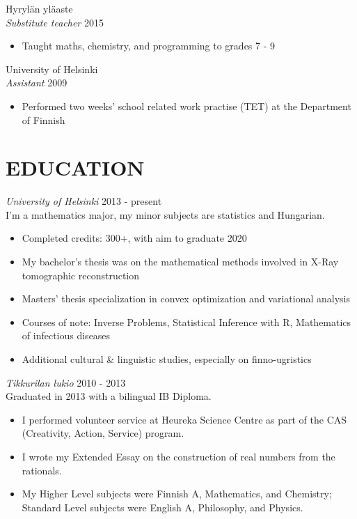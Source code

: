 \documentclass[margin, 10pt]{res} %
\begin{document}
\begin{resume}
\addvspace{-7pt}
Hyrylän yläaste\\
{\sl Substitute teacher} \hfill 2015
\begin{itemize} \itemsep -2pt %
\item Taught maths, chemistry, and programming to grades 7 - 9
\end{itemize}
\addvspace{-7pt}
University of Helsinki\\
{\sl Assistant} \hfill 2009
\begin{itemize} \itemsep -2pt %
\item Performed two weeks' school related work practise (TET) at the Department of Finnish
\end{itemize}
  

\section{EDUCATION}

{\sl University of Helsinki} \hfill 2013 - present\\
I'm a mathematics major, my minor subjects are statistics and Hungarian.
\begin{itemize} \itemsep -2pt
\item Completed credits: 300+, with aim to graduate 2020
\item My bachelor's thesis was on the mathematical methods involved in X-Ray tomographic reconstruction
\item Masters' thesis specialization in convex optimization and variational analysis
\item Courses of note: Inverse Problems, Statistical Inference with R, Mathematics of infectious diseases
\item Additional cultural \& linguistic studies, especially on finno-ugristics
\end{itemize}

\addvspace{-7pt}
{\sl Tikkurilan lukio} \hfill 2010 - 2013\\
Graduated in 2013 with a bilingual IB Diploma.
\begin{itemize} \itemsep -2pt
\item I performed volunteer service at Heureka Science Centre as part of the CAS (Creativity, Action, Service) program.
\item I wrote my Extended Essay on the construction of real numbers from the rationals.
\item My Higher Level subjects were Finnish A, Mathematics, and Chemistry; Standard Level subjects were English A, Philosophy, and Physics. 
\end{itemize}


\end{resume}
\end{document}
